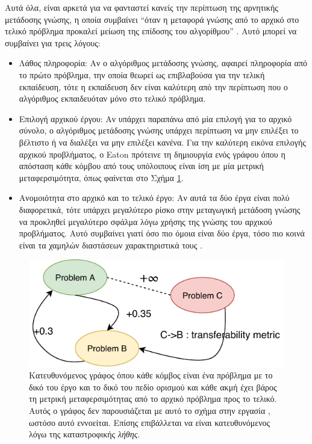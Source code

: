 Αυτά όλα, είναι αρκετά για να φανταστεί κανείς την περίπτωση της αρνητικής μετάδοσης γνώσης, η οποία συμβαίνει “όταν η μεταφορά γνώσης από το αρχικό στο τελικό πρόβλημα προκαλεί μείωση της επίδοσης του αλγορίθμου” \cite{58}. Αυτό μπορεί να συμβαίνει για τρεις λόγους:
\begin{itemize}
\item Λάθος πληροφορία: Αν ο αλγόριθμος μετάδοσης γνώσης, αφαιρεί πληροφορία από το πρώτο πρόβλημα, την οποία θεωρεί ως επιβλαβούσα για την τελική εκπαίδευση, τότε η εκπαίδευση δεν είναι καλύτερη από την περίπτωση που ο αλγόριθμος εκπαιδευόταν μόνο στο τελικό πρόβλημα.
\item Επιλογή αρχικού έργου: Αν υπάρχει παραπάνω από μία επιλογή για το αρχικό σύνολο, ο αλγόριθμος μετάδοσης γνώσης υπάρχει περίπτωση να μην επιλέξει το βέλτιστο ή να διαλέξει να μην επιλέξει κανένα. Για την καλύτερη εικόνα επιλογής αρχικού προβλήματος, ο Eaton \cite{59} πρότεινε τη δημιουργία ενός γράφου όπου η απόσταση κάθε κόμβου από τους υπόλοιπους είναι ίση με μία μετρική μεταφερσιμότητα, όπως φαίνεται στο Σχήμα \ref{fig:transferability_graph}.
\item Ανομοιότητα στο αρχικό και το τελικό έργο: Αν αυτά τα δύο έργα είναι πολύ διαφορετικά, τότε υπάρχει μεγαλύτερο ρίσκο στην μεταγωγική μετάδοση γνώσης να προκληθεί μεγαλύτερο σφάλμα λόγω χρήσης της γνώσης του αρχικού προβλήματος. Αυτό συμβαίνει γιατί όσο πιο όμοια είναι δύο έργα, τόσο πιο κοινά είναι τα χαμηλών διαστάσεων χαρακτηριστικά τους \cite{60}.
\end{itemize}

\begin{figure}[H]
\centering
\includegraphics[width = \textwidth]{figures/transferLearning/transferability_graph.pdf}
\caption[Γράφος μεταφερσιμότητας]{Κατευθυνόμενος γράφος όπου κάθε κόμβος είναι ένα πρόβλημα με το δικό του έργο και το δικό του πεδίο ορισμού και κάθε ακμή έχει βάρος τη μετρική μεταφερσιμότητας από το αρχικό πρόβλημα προς το τελικό. Αυτός ο γράφος δεν παρουσιάζεται με αυτό το σχήμα στην εργασία \cite{59}, ωστόσο αυτό εννοείται. Επίσης επιβάλλεται να είναι κατευθυνόμενος λόγω της καταστροφικής \textit{λήθης}.}
\label{fig:transferability_graph}
\end{figure}

